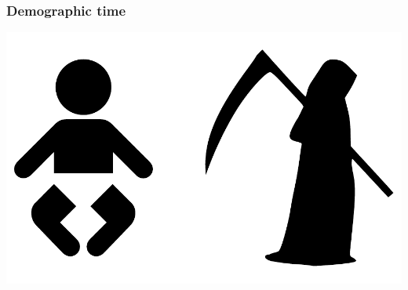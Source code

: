 \documentclass[20pt]{beamer}
\begin{document}
\begin{frame}
\frametitle{Demographic time}
\begin{center}
\includegraphics[scale=1.5]{Figures/BirthDeath.pdf}
\end{center}
\end{frame}
\end{document}
